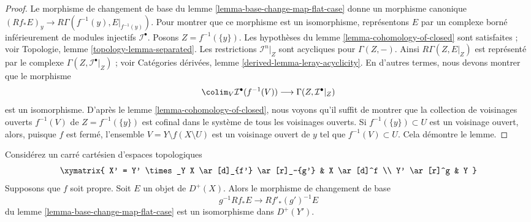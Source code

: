 \begin{proof}

Le morphisme de changement de base du lemme \ref{lemma-base-change-map-flat-case}
donne un morphisme canonique $(Rf_*E)_y \to R\Gamma(f^{-1}(y), E|_{f^{-1}(y)})$. Pour montrer que ce morphisme est un isomorphisme, représentons $E$ par un complexe borné inférieurement de modules injectifs $\mathcal{I}^\bullet$. Posons $Z = f^{-1}(\{y\})$. Les hypothèses du lemme \ref{lemma-cohomology-of-closed}
sont satisfaites ; voir Topologie, lemme \ref{topology-lemma-separated}. Les restrictions
$\mathcal{I}^n|_Z$ sont acycliques pour $\Gamma(Z, -)$. Ainsi $R\Gamma(Z, E|_Z)$ est représenté par le complexe $\Gamma(Z, \mathcal{I}^\bullet|_Z)$ ; voir Catégories dérivées, lemme \ref{derived-lemma-leray-acyclicity}. En d'autres termes, nous devons montrer que le morphisme
$$
\colim_V \mathcal{I}^\bullet(f^{-1}(V))
\longrightarrow
\Gamma(Z, \mathcal{I}^\bullet|_Z)
$$
est un isomorphisme. D'après le lemme \ref{lemma-cohomology-of-closed},
nous voyons qu'il suffit de montrer que la collection de voisinages ouverts
$f^{-1}(V)$ de $Z = f^{-1}(\{y\})$
est cofinal dans le système de tous les voisinages ouverts. Si $f^{-1}(\{y\}) \subset U$ est un voisinage ouvert, alors, puisque $f$ est fermé, l'ensemble $V = Y \setminus f(X \setminus U)$ est un voisinage ouvert de $y$ tel que $f^{-1}(V) \subset U$. Cela démontre le lemme.

\end{proof}

\begin{theorem}
\label{theorem-proper-base-change}

\begin{reference}
\cite[Expose V bis, 4.1.1]{SGA4}
\end{reference}
Considérez un carré cartésien d'espaces topologiques $$
\xymatrix{
X' = Y' \times_Y X \ar[d]_{f'} \ar[r]_-{g'} & X \ar[d]^f \\
Y' \ar[r]^g & Y
}
$$ Supposons que $f$ soit propre. Soit $E$ un objet de $D^+(X)$. Alors le morphisme de changement de base $$
g^{-1}Rf_*E \longrightarrow Rf'_*(g')^{-1}E
$$ du lemme \ref{lemma-base-change-map-flat-case} est un isomorphisme dans $D^+(Y')$.
\end{theorem}

